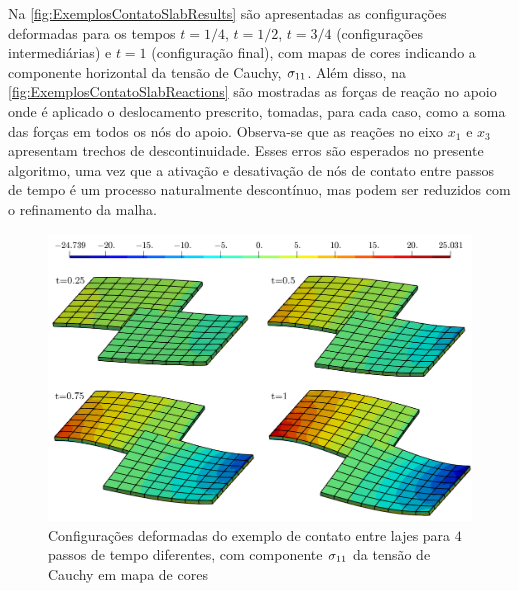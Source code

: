 \documentclass[Tese.tex]{subfiles}
\begin{document}
Na \autoref{fig:ExemplosContatoSlabResults} são apresentadas as configurações deformadas para os tempos $t=1/4$, $t=1/2$, $t=3/4$ (configurações intermediárias) e $t=1$ (configuração final), com mapas de cores indicando a componente horizontal da tensão de Cauchy, ${\sigma}_{11}$. Além disso, na \autoref{fig:ExemplosContatoSlabReactions} são mostradas as forças de reação no apoio onde é aplicado o deslocamento prescrito, tomadas, para cada caso, como a soma das forças em todos os nós do apoio. Observa-se que as reações no eixo $x_1$ e $x_3$ apresentam trechos de descontinuidade. Esses erros são esperados no presente algoritmo, uma vez que a ativação e desativação de nós de contato entre passos de tempo é um processo naturalmente descontínuo, mas podem ser reduzidos com o refinamento da malha.

\begin{figure}[!htb]
	\centering
	\caption{Configurações deformadas do exemplo de contato entre lajes para $4$ passos de tempo diferentes, com componente ${\sigma}_{11}$ da tensão de Cauchy em mapa de cores}
	\label{fig:ExemplosContatoSlabResults}
	\includegraphics[scale=0.37]{Figuras/ExemplosContato/ContactSlabResults.png}
\end{figure}
\end{document}

